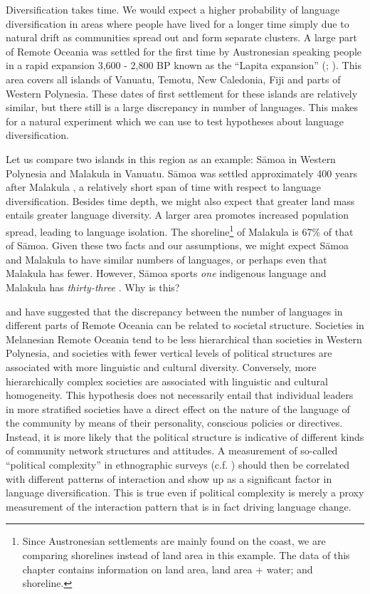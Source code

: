 \documentclass[a4paper,10pt]{article} %
\begin{document}
Diversification takes time. We would expect a higher probability of language diversification in areas where people have lived for a longer time simply due to natural drift as communities spread out and form separate clusters. A large part of Remote Oceania was settled for the first time by Austronesian speaking people in a rapid expansion 3,600 - 2,800 BP known as the ``Lapita expansion'' (\citet[106-7]{bellwood2006austronesians}; \citet[137]{rieth_cochrane_2018}). This area covers all islands of Vanuatu, Temotu, New Caledonia, Fiji and parts of Western Polynesia. These dates of first settlement for these islands are relatively similar, but there still is a large discrepancy in number of languages. This makes for a natural experiment which we can use to test hypotheses about language diversification.

Let us compare two islands in this region as an example: S\={a}moa in Western Polynesia and Malakula in Vanuatu. S\={a}moa was settled approximately 400 years after Malakula  \citep[137-8]{rieth_cochrane_2018}, a relatively short span of time with respect to language diversification. Besides time depth, we might also expect that greater land mass entails greater language diversity. A larger area promotes increased population spread, leading to language isolation. The shoreline\footnote{Since Austronesian settlements are mainly found on the coast, we are comparing shorelines instead of land area in this example. The data of this chapter contains information on land area, land area + water; and shoreline.} of Malakula is 67\% of that of S\={a}moa. Given these two facts and our assumptions, we might expect S\={a}moa and Malakula to have similar numbers of languages, or perhaps even that Malakula has fewer. However, S\={a}moa sports \emph{one} indigenous language and Malakula has \emph{thirty-three} \citep{glottolog40}. Why is this?


\citet{turner1884} and \citet{pawley81,pawley2007} have suggested that the discrepancy between the number of languages in different parts of Remote Oceania can be related to societal structure. Societies in Melanesian Remote Oceania tend to be less hierarchical than societies in Western Polynesia, and societies with fewer vertical levels of political structures are associated with more linguistic and cultural diversity. Conversely, more hierarchically complex societies are associated with linguistic and cultural homogeneity. This hypothesis does not necessarily entail that individual leaders in more stratified societies have a direct effect on the nature of the language of the community by means of their personality, conscious policies or directives. Instead, it is more likely that the political structure is indicative of different kinds of community network structures and attitudes. A measurement of so-called ``political complexity'' in ethnographic surveys (c.f. \citet{gray1998ethnographic}) should then be correlated with different patterns of interaction and show up as a significant factor in language diversification. This is true even if political complexity is merely a proxy measurement of the interaction pattern that is in fact driving language change. 
\end{document}
